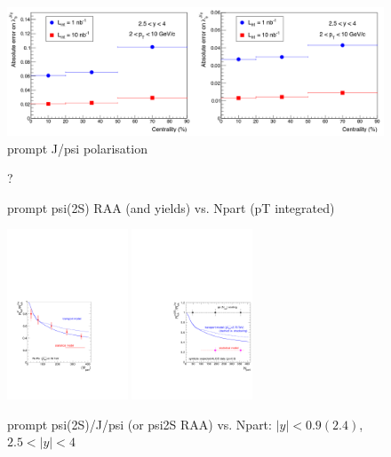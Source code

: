 \documentclass[../report.tex]{subfiles}
\begin{document}
\begin{figure}
\begin{center}
\includegraphics[width=\textwidth]{fig/alice/jpsi_polarisation.png}
\end{center}

 \caption{prompt J/psi polarisation~\cite{Abelev:1475243}}
\end{figure}

\begin{figure}
\begin{center}
 ?
\end{center}

 \caption{prompt psi(2S) RAA (and yields) vs. Npart (pT integrated) }
\end{figure}

\begin{figure}
\begin{center}
 \includegraphics[width=0.32\textwidth]{fig/alice/alice_dr_psi_projected}
 \includegraphics[width=0.32\textwidth]{fig/alice/alice_dr_psi_projected2}
\end{center}

 \caption{prompt psi(2S)/J/psi (or psi2S RAA) vs. Npart: $|y|<0.9 (2.4)$, $2.5<|y|<4$}
\end{figure}
\end{document}
